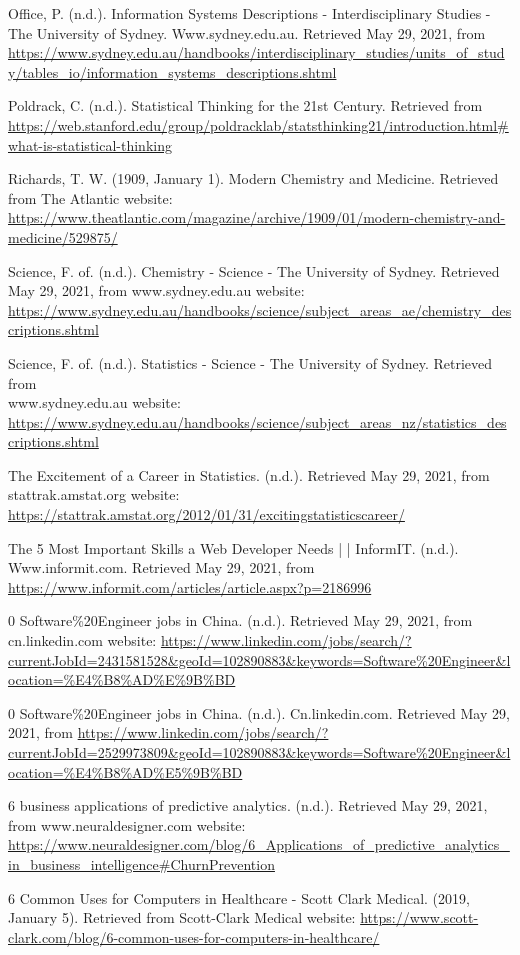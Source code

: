\documentclass[12pt]{article}
\begin{document}
Office, P. (n.d.). Information Systems Descriptions - Interdisciplinary Studies - The University of Sydney. Www.sydney.edu.au. Retrieved May 29, 2021, from
\url{https://www.sydney.edu.au/handbooks/interdisciplinary_studies/units_of_study/tables_io/information_systems_descriptions.shtml}

Poldrack, C. (n.d.). Statistical Thinking for the 21st Century. Retrieved from
\url{https://web.stanford.edu/group/poldracklab/statsthinking21/introduction.html#what-is-statistical-thinking}

Richards, T. W. (1909, January 1). Modern Chemistry and Medicine. Retrieved from The Atlantic website:
\url{https://www.theatlantic.com/magazine/archive/1909/01/modern-chemistry-and-medicine/529875/}

Science, F. of. (n.d.). Chemistry - Science - The University of Sydney. Retrieved May 29, 2021, from www.sydney.edu.au website:
\url{https://www.sydney.edu.au/handbooks/science/subject_areas_ae/chemistry_descriptions.shtml}

Science, F. of. (n.d.). Statistics - Science - The University of Sydney. Retrieved from\\ www.sydney.edu.au website:
\url{https://www.sydney.edu.au/handbooks/science/subject\_areas\_nz/statistics\_descriptions.shtml}

The Excitement of a Career in Statistics. (n.d.). Retrieved May 29, 2021, from stattrak.amstat.org website:
\url{https://stattrak.amstat.org/2012/01/31/excitingstatisticscareer/}

The 5 Most Important Skills a Web Developer Needs | | InformIT. (n.d.). Www.informit.com. Retrieved May 29, 2021, from
\url{ https://www.informit.com/articles/article.aspx?p=2186996}

0 Software\%20Engineer jobs in China. (n.d.). Retrieved May 29, 2021, from cn.linkedin.com website:
\url{https://www.linkedin.com/jobs/search/?currentJobId=2431581528&geoId=102890883&keywords=Software\%20Engineer&location=\%E4\%B8\%AD\%E\%9B\%BD}

0 Software\%20Engineer jobs in China. (n.d.). Cn.linkedin.com. Retrieved May 29, 2021, from
\url{ https://www.linkedin.com/jobs/search/?currentJobId=2529973809&geoId=102890883&keywords=Software\%20Engineer&location=\%E4\%B8\%AD\%E5\%9B\%BD}

6 business applications of predictive analytics. (n.d.). Retrieved May 29, 2021, from www.neuraldesigner.com website:
\url{https://www.neuraldesigner.com/blog/6\_Applications\_of\_predictive\_analytics\_in\_business\_intelligence#ChurnPrevention}


6 Common Uses for Computers in Healthcare - Scott Clark Medical. (2019, January 5). Retrieved from Scott-Clark Medical website:
\url{https://www.scott-clark.com/blog/6-common-uses-for-computers-in-healthcare/}
\end{document}
